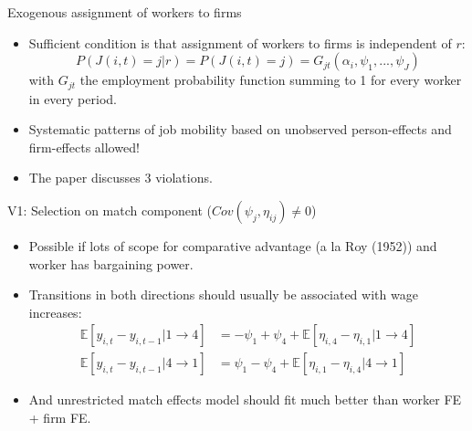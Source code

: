 \documentclass[notes=show]{beamer}
\begin{document}
\begin{frame}{Exogenous assignment of workers to firms}
\begin{itemize}
    \item Sufficient condition is that assignment of workers to firms is independent of $r$:
    \begin{equation}
	P(J(i,t)=j|r)=P(J(i,t)=j)=G_{jt}(\alpha_i, \psi_1,...,\psi_J) 
    \end{equation}
with $G_{jt}$ the employment probability function summing to 1 for every worker in every period. \medskip
    \item Systematic patterns of job mobility based on unobserved person-effects and firm-effects allowed! \medskip
    \item The paper discusses 3 violations.
\end{itemize}
\end{frame}

\begin{frame}{V1: Selection on match component ($Cov(\psi_{j},\eta_{ij}) \neq 0$)}
	\begin{itemize}
		\item Possible if lots of scope for comparative advantage (a la Roy (1952)) and worker has bargaining power. \medskip
            \item Transitions in both directions should usually be associated with wage increases:
            \begin{align*}
                \mathbb{E} \left[ y_{i,t} - y_{i,t-1} | 1 \rightarrow 4 \right] & = - \psi_{1} + \psi_{4} + \mathbb{E} \left[ \eta_{i,4} - \eta_{i,1} | 1 \rightarrow 4 \right] \\
                \mathbb{E} \left[ y_{i,t} - y_{i,t-1} | 4 \rightarrow 1 \right] & = \psi_{1} - \psi_{4} + \mathbb{E} \left[ \eta_{i,1} - \eta_{i,4} | 4 \rightarrow 1 \right]
            \end{align*}
            \item And unrestricted match effects model should fit much better than worker FE + firm FE.
	\end{itemize}
\end{frame}
\end{document}
